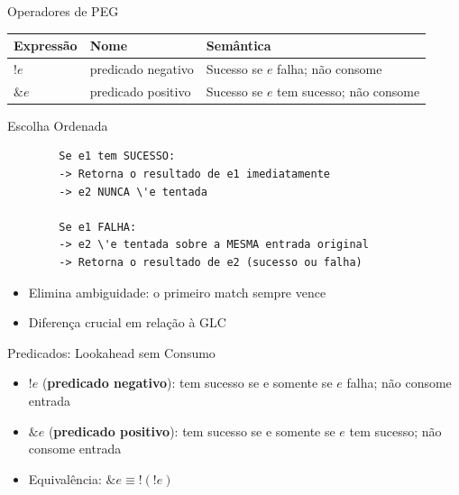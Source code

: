 \begin{frame}{Operadores de PEG}

    \begin{table}
        \begin{tabular}{l l l}
            \hline
            Expressão & Nome & Semântica \\
    \hline
    \(!e\) & predicado negativo & Sucesso se \(e\) falha; não consome \\
    \(\&e\) & predicado positivo & Sucesso se \(e\) tem sucesso; não
    consome \\
    \hline
\end{tabular}
\end{table}
\end{frame}

\begin{frame}[fragile]{Escolha Ordenada}

    \begin{lstlisting}
        Se e1 tem SUCESSO:
        -> Retorna o resultado de e1 imediatamente
        -> e2 NUNCA \'e tentada

        Se e1 FALHA:
        -> e2 \'e tentada sobre a MESMA entrada original
        -> Retorna o resultado de e2 (sucesso ou falha)
    \end{lstlisting}

    \begin{itemize}

        \item
        Elimina ambiguidade: o primeiro match sempre vence
        \item
        Diferença crucial em relação à GLC
    \end{itemize}
\end{frame}

\begin{frame}{Predicados: Lookahead sem Consumo}

    \begin{itemize}

        \item
        \(!e\) (\textbf{predicado negativo}): tem sucesso se e somente se
        \(e\) falha; não consome entrada
        \item
        \(\&e\) (\textbf{predicado positivo}): tem sucesso se e somente se
        \(e\) tem sucesso; não consome entrada
        \item
        Equivalência: \(\&e \equiv !(! e)\)
    \end{itemize}
\end{frame}

